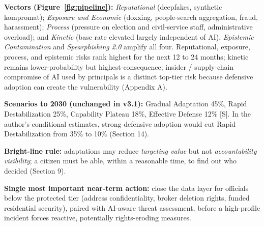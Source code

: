 \documentclass[11pt,letterpaper]{article}
\begin{document}
\begin{infobox}
\textbf{Vectors (Figure~\ref{fig:pipeline}):} \textit{Reputational} (deepfakes, synthetic kompromat); \textit{Exposure and Economic} (doxxing, people-search aggregation, fraud, harassment); \textit{Process} (pressure on election and civil-service staff, administrative overload); and \textit{Kinetic} (base rate elevated largely independent of AI). \textit{Epistemic Contamination} and \textit{Spearphishing 2.0} amplify all four. Reputational, exposure, process, and epistemic risks rank highest for the next 12 to 24 months; kinetic remains lower-probability but highest-consequence; insider / supply-chain compromise of AI used by principals is a distinct top-tier risk because defensive adoption can create the vulnerability (Appendix A).

\textbf{Scenarios to 2030 (unchanged in v3.1):} Gradual Adaptation 45\%, Rapid Destabilization 25\%, Capability Plateau 18\%, Effective Defense 12\% [S]. In the author's conditional estimates, strong defensive adoption would cut Rapid Destabilization from 35\% to 10\% (Section 14).

\textbf{Bright-line rule:} adaptations may reduce \textit{targeting value} but not \textit{accountability visibility}; a citizen must be able, within a reasonable time, to find out who decided (Section 9).

\textbf{Single most important near-term action:} close the data layer for officials below the protected tier (address confidentiality, broker deletion rights, funded residential security), paired with AI-aware threat assessment, before a high-profile incident forces reactive, potentially rights-eroding measures.
\end{infobox}
\end{document}
